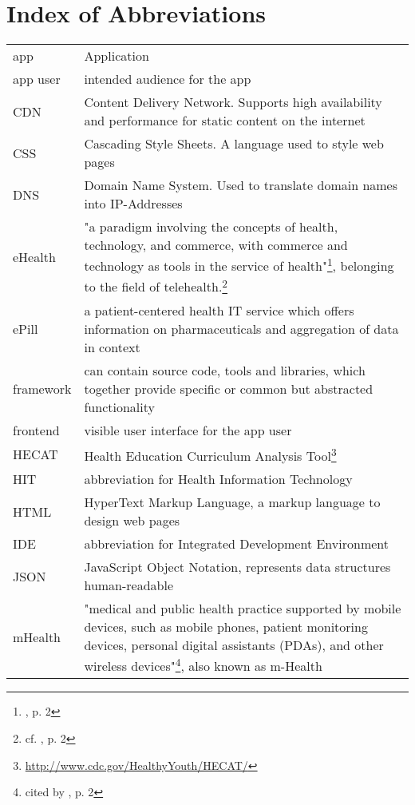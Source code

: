 \section*{Index of Abbreviations}
\begin{longtable}{@{}p{}@{}p{}@{}}
    app & Application \\
    app user & intended audience for the app \\
    CDN & Content Delivery Network. Supports high availability and performance for static content on the internet \\
    CSS & Cascading Style Sheets. A language used to style web pages \\
    DNS & Domain Name System. Used to translate domain names into IP-Addresses \\
    eHealth & "a paradigm involving the concepts of health, technology, and commerce, with commerce and technology as tools in the service of health"\footnote{\cite{MartinezPerez.2013}, p. 2}, belonging to the field of telehealth.\footnote{cf. \cite{MartinezPerez.2013}, p. 2} \\
    ePill & a patient-centered health IT service which offers information on pharmaceuticals and aggregation of data in context \\
    framework & can contain source code, tools and libraries, which together provide specific or common but abstracted functionality \\
    frontend & visible user interface for the app user \\
    HECAT & Health Education Curriculum Analysis Tool\footnote{\url{http://www.cdc.gov/HealthyYouth/HECAT/}} \\
    HIT & abbreviation for Health Information Technology \\
    HTML & HyperText Markup Language, a markup language to design web pages \\
    IDE & abbreviation for Integrated Development Environment \\
    JSON & JavaScript Object Notation, represents data structures human-readable \\
    mHealth & "medical and public health practice supported by mobile devices, such as mobile phones, patient monitoring devices, personal digital assistants (PDAs), and other wireless devices"\footnote{\cite{WorldHealthOrganization.2011} cited by \cite{MartinezPerez.2013}, p. 2}, also known as m-Health \\

\end{longtable}
